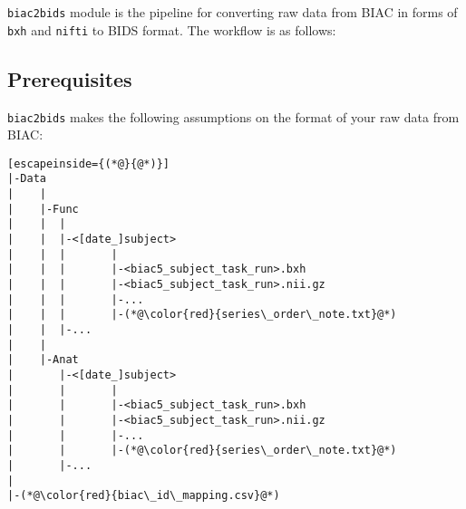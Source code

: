 \documentclass[12pt]{myland}
\def\<#1>{\texttt{#1}}
\begin{document}
   \texttt{biac2bids} module is the pipeline for converting raw data from BIAC in forms of \texttt{bxh} and
   \texttt{nifti} to BIDS format. The workflow is as follows:

    \begin{figure}[h]
        \begin{mybox}
        \end{mybox}
    \end{figure}

    \subsection{Prerequisites}
    \<biac2bids> makes the following assumptions on the format of your raw data from BIAC:
   \begin{lstlisting}[escapeinside={(*@}{@*)}]
|-Data
|    |
|    |-Func
|    |  |
|    |  |-<[date_]subject>
|    |  |       |
|    |  |       |-<biac5_subject_task_run>.bxh
|    |  |       |-<biac5_subject_task_run>.nii.gz
|    |  |       |-...
|    |  |       |-(*@\color{red}{series\_order\_note.txt}@*)
|    |  |-...
|    |
|    |-Anat
|       |-<[date_]subject>
|       |       |
|       |       |-<biac5_subject_task_run>.bxh
|       |       |-<biac5_subject_task_run>.nii.gz
|       |       |-...
|       |       |-(*@\color{red}{series\_order\_note.txt}@*)
|       |-...
|
|-(*@\color{red}{biac\_id\_mapping.csv}@*)
    \end{lstlisting}
\end{document}
